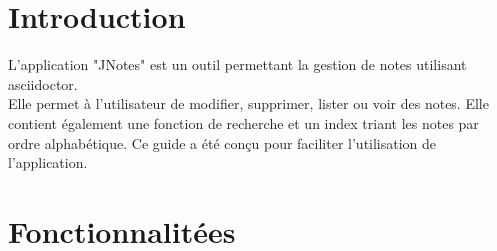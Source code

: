 \documentclass[a4paper,11pt]{article}
\title{\vspace{13em}{\huge Manuel utilisateur}}
\author{Clément Caumes - Mehdi Merimi - Sarah Ngoc-Mai Pho - Maxime Gonthier\\
		\vspace{2em}\\
		JNotes
		\vspace{2em}}
\begin{document}
	
	\clearpage
	\maketitle\vspace{13em}
\newpage
\tableofcontents
\newpage\clearpage{}
	
	\section{Introduction}
		L'application "JNotes" est un outil permettant la gestion de notes utilisant asciidoctor.\\
		Elle permet à l'utilisateur de modifier, supprimer, lister ou voir des notes. Elle contient également une fonction de recherche et un index triant les notes par ordre alphabétique.
		Ce guide a été conçu pour faciliter l'utilisation de l'application.
			
	\section{Fonctionnalitées}
\end{document}
